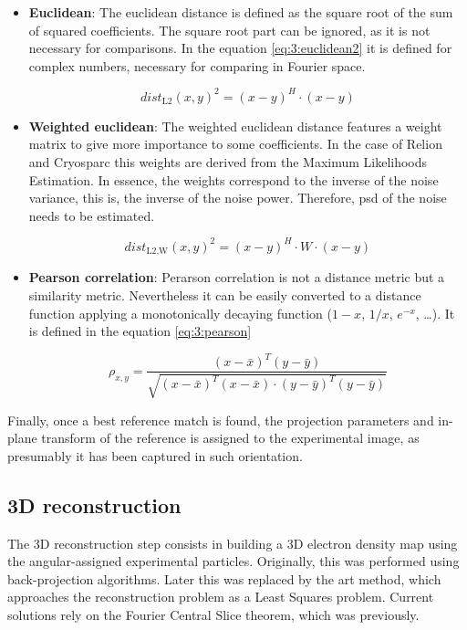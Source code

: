 \documentclass[../main.tex]{subfiles}
\begin{document}
\begin{itemize}
    \item \textbf{Euclidean}: The euclidean distance is defined as the square root of the sum of squared coefficients. The square root part can be ignored, as it is not necessary for comparisons. In the equation \eqref{eq:3:euclidean2} it is defined for complex numbers, necessary for comparing in Fourier space.

    \begin{equation}\label{eq:3:euclidean2}
        dist_{\text{L2}}(x, y)^2 = (x-y)^H \cdot (x-y)
    \end{equation}
    
    \item \textbf{Weighted euclidean}: The weighted euclidean distance features a weight matrix to give more importance to some coefficients. In the case of Relion\cite{scheres2021} and Cryosparc\cite{cryosparc} this weights are derived from the Maximum Likelihoods Estimation. In essence, the weights correspond to the inverse of the noise variance, this is, the inverse of the noise power. Therefore, \gls{psd} of the noise needs to be estimated.
    
    \begin{equation}\label{eq:3:euclidean2_weighted}
        dist_{\text{L2,W}}(x, y)^2 = (x-y)^H \cdot W \cdot (x-y)
    \end{equation}
    
    \item \textbf{Pearson correlation}: Perarson correlation is not a distance metric but a similarity metric. Nevertheless it can be easily converted to a distance function applying a monotonically decaying function ($1-x$, $1/x$, $e^{-x}$, \dots). It is defined in the equation \eqref{eq:3:pearson}
    
    \begin{equation}\label{eq:3:pearson}
        \rho_{x,y} =    \frac{
                        (x-\bar{x})^T(y-\bar{y})
                        }{
                        \sqrt{(x-\bar{x})^T(x-\bar{x}) \cdot (y-\bar{y})^T(y-\bar{y})}
                        }
    \end{equation}
\end{itemize}

Finally, once a best reference match is found, the projection parameters and in-plane transform of the reference is assigned to the experimental image, as presumably it has been captured in such orientation.

\subsection{3D reconstruction}
The 3D reconstruction step consists in building a 3D electron density map using the angular-assigned experimental particles. Originally, this was performed using back-projection algorithms. Later this was replaced by the \gls{art} method, which approaches the reconstruction problem as a Least Squares problem. Current solutions rely on the Fourier Central Slice theorem, which was previously.
\end{document}
